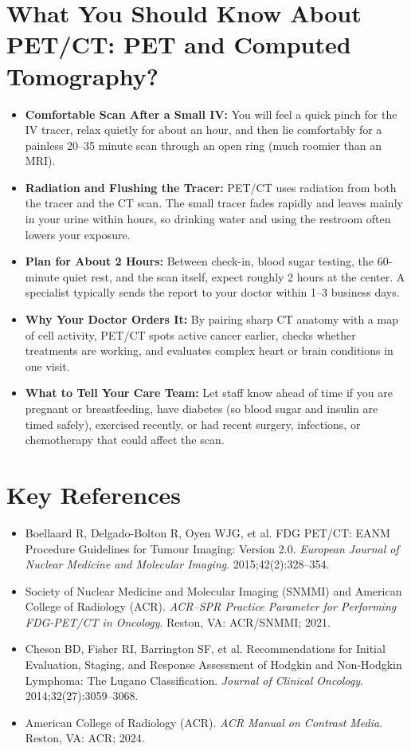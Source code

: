 \section{What You Should Know About PET/CT: PET and Computed Tomography?}

\begin{itemize}
    \item \textbf{Comfortable Scan After a Small IV:} You will feel a quick pinch for the IV tracer, relax quietly for about an hour, and then lie comfortably for a painless 20--35 minute scan through an open ring (much roomier than an MRI).
    \item \textbf{Radiation and Flushing the Tracer:} PET/CT uses radiation from both the tracer and the CT scan. The small tracer fades rapidly and leaves mainly in your urine within hours, so drinking water and using the restroom often lowers your exposure.
    \item \textbf{Plan for About 2 Hours:} Between check-in, blood sugar testing, the 60-minute quiet rest, and the scan itself, expect roughly 2 hours at the center. A specialist typically sends the report to your doctor within 1--3 business days.
    \item \textbf{Why Your Doctor Orders It:} By pairing sharp CT anatomy with a map of cell activity, PET/CT spots active cancer earlier, checks whether treatments are working, and evaluates complex heart or brain conditions in one visit.
    \item \textbf{What to Tell Your Care Team:} Let staff know ahead of time if you are pregnant or breastfeeding, have diabetes (so blood sugar and insulin are timed safely), exercised recently, or had recent surgery, infections, or chemotherapy that could affect the scan.
\end{itemize}

\section{Key References}

\begin{itemize}
    \item Boellaard R, Delgado-Bolton R, Oyen WJG, et al. FDG PET/CT: EANM Procedure Guidelines for Tumour Imaging: Version 2.0. \textit{European Journal of Nuclear Medicine and Molecular Imaging}. 2015;42(2):328--354.
    \item Society of Nuclear Medicine and Molecular Imaging (SNMMI) and American College of Radiology (ACR). \textit{ACR--SPR Practice Parameter for Performing FDG-PET/CT in Oncology}. Reston, VA: ACR/SNMMI; 2021.
    \item Cheson BD, Fisher RI, Barrington SF, et al. Recommendations for Initial Evaluation, Staging, and Response Assessment of Hodgkin and Non-Hodgkin Lymphoma: The Lugano Classification. \textit{Journal of Clinical Oncology}. 2014;32(27):3059--3068.
    \item American College of Radiology (ACR). \textit{ACR Manual on Contrast Media}. Reston, VA: ACR; 2024.
\end{itemize}
